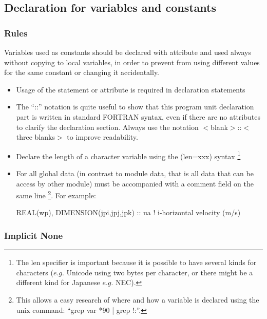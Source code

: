 \documentclass{article}
\begin{document}
\subsection{Declaration for variables and constants}

\subsubsection{Rules}

Variables used as constants should be declared with attribute  and
used always without copying to local variables, in order to
prevent from using different values for the same constant or changing it accidentally.

\begin{itemize}
\item
  Usage of the  statement or attribute is required in declaration statements
\item
  The ``::'' notation is quite useful to show that this program unit declaration part is written in
  standard FORTRAN syntax, even if there are no attributes to clarify the declaration section.
  Always use the notation $<$blank$>$::$<$three blanks$>$ to improve readability.
\item
  Declare the length of a character variable using the  (len=xxx) syntax
  \footnote {
    The len specifier is important because it is possible to have several kinds for characters
    ($e.g.$ Unicode using two bytes per character, or there might be a different kind for Japanese $e.g.$ NEC).
  }
\item
  For all global data (in contrast to module data, that is all data that can be access by other module)
  must be accompanied with a comment field on the same line
  \footnote {
    This allows a easy research of where and how a variable is declared using the unix command:
    ``grep var *90 | grep !:''.
  }.
  For example:
  \begin{forlines}
  REAL(wp), DIMENSION(jpi,jpj,jpk) ::  ua   ! i-horizontal velocity (m/s)
  \end{forlines}
\end{itemize}

\subsubsection{Implicit None}
\end{document}
